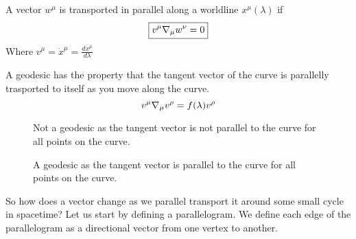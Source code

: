 \documentclass{article}
\begin{document}
 		\begin{thm}
 			A vector $w^\mu$ is transported in parallel along a worldline $x^\mu (\lambda)$ if 
 			\begin{equation}
 				\label{eq:ParallellyTransported}
 				\boxed{v^\mu \nabla_\mu w^\nu = 0}
 			\end{equation}
 			Where $v^\mu = \dot{x}^\mu = \frac{dx^\mu}{d\lambda}$ 
 		\end{thm}
 		\begin{exmp}
 			A geodesic has the property that the tangent vector of the curve is parallelly trasported to itself as you move along the curve.
 			$$ v^\mu \nabla_\mu v^\rho = f(\lambda)v^\rho$$
 			
 			\begin{figure}[h]
 				\begin{minipage}{0.46\textwidth}
 					\centering
 					\vspace{0.45cm}
 					\caption{Not a geodesic as the tangent vector is not parallel to the curve for all points on the curve.}
 				\end{minipage}
 				\hfill
 				\begin{minipage}{0.46\textwidth}
 					\centering
 					\caption{A geodesic as the tangent vector is parallel to the curve for all points on the curve.}
 				\end{minipage}
 			\end{figure}
 		\end{exmp}
 		So how does a vector change as we parallel transport it around some small cycle in spacetime? Let us start by defining a parallelogram. We define each edge of the parallelogram as a directional vector from one vertex to another.
\end{document}
